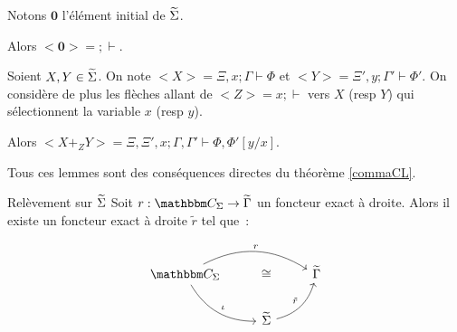 \begin{lem}
    Notons $\mathbf{0}$ l'élément initial de $\widetilde{\Sigma}$.
    
    Alors $<\mathbf{0}> = ;\vdash$.
\end{lem}

\begin{lem}
    Soient $X,Y\in\widetilde{\Sigma}$. On note $<X> = \Xi,x;\Gamma\vdash\Phi$ et
    $<Y> = \Xi',y;\Gamma'\vdash\Phi'$. On considère de plus les flèches allant de
    $<Z> = x;\vdash$ vers $X$ (resp $Y$) qui sélectionnent la variable $x$ (resp $y$).

    Alors $<X +_Z Y> = \Xi,\Xi',x;\Gamma,\Gamma'\vdash\Phi,\Phi'[y/x]$.
\end{lem}

\begin{pv}
    Tous ces lemmes sont des conséquences directes du théorème \ref{commaCL}.
\end{pv}

\begin{theo}{Relèvement sur $\widetilde{\Sigma}$}\label{lifting}
    Soit $r : \C_\Sigma\rightarrow\tgamma$ un foncteur exact à droite. Alors il
    existe un foncteur exact à droite $\tilde{r}$ tel que~:

    \[\begin{tikzcd}
        \C_\Sigma\arrow[dr, bend right, "\iota"]\arrow[rr, bend left, "r"]
            & \cong & \tgamma \\
        & \tsigma\arrow[ur, bend right, "\tilde{r}"] & \\
    \end{tikzcd}\]
\end{theo}

